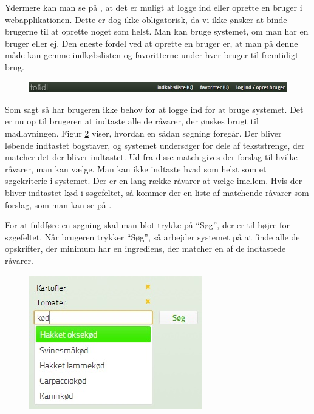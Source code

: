 Ydermere kan man se på , at det er muligt at logge ind eller oprette en bruger i webapplikationen. Dette er dog ikke obligatorisk, da vi ikke ønsker at binde brugerne til at oprette noget som helst. Man kan bruge systemet, om man har en bruger eller ej. Den eneste fordel ved at oprette en bruger er, at man på denne måde kan gemme indkøbslisten og favoritterne under hver bruger til fremtidigt brug.

\begin{figure}[H]
	\centering
	\includegraphics[scale=0.7]{billeder/foodl/header.jpg}
	\label{fig:foodl-header}
\end{figure}

Som sagt så har brugeren ikke behov for at logge ind for at bruge systemet. Det er nu op til brugeren at indtaste alle de råvarer, der ønskes brugt til madlavningen. Figur \ref{fig:foodl-soegefelt} viser, hvordan en sådan søgning foregår. Der bliver løbende indtastet bogstaver, og systemet undersøger for dele af tekststrenge, der matcher det der bliver indtastet. Ud fra disse match gives der forslag til hvilke råvarer, man kan vælge. Man kan ikke indtaste hvad som helst som et søgekriterie i systemet. Der er en lang række råvarer at vælge imellem. Hvis der \fx bliver indtastet kød i søgefeltet, så kommer der en liste af matchende råvarer som forslag, som man kan se på .

For at fuldføre en søgning skal man blot trykke på ``Søg'', der er til højre for søgefeltet. Når brugeren trykker ``Søg'', så arbejder systemet på at finde alle de opskrifter, der minimum har en ingrediens, der matcher en af de indtastede råvarer.

\begin{figure}[H]
	\centering
	\includegraphics[scale=0.7]{billeder/foodl/soegefelt.jpg}
	\label{fig:foodl-soegefelt}
\end{figure}

